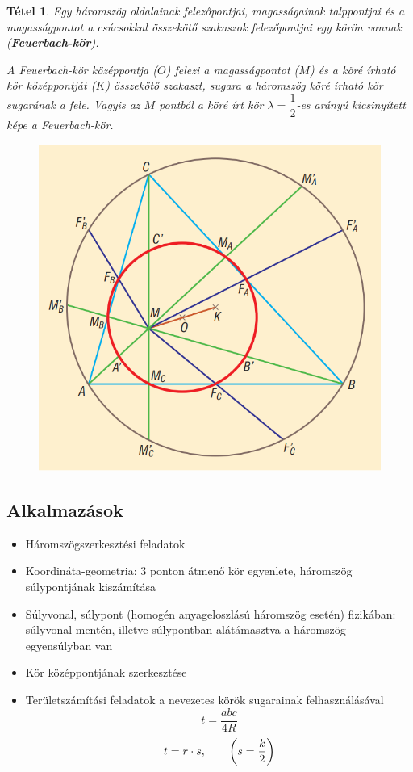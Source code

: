 \documentclass[12pt,a4paper]{article}
\newtheorem{theorem}{Tétel} [section]
\begin{document}
\begin{theorem}
Egy háromszög oldalainak felezőpontjai, magasságainak talppontjai és a magasságpontot a csúcsokkal összekötő szakaszok felezőpontjai egy körön vannak (\textbf{Feuerbach-kör}).

A Feuerbach-kör középpontja ($O$) felezi a magasságpontot ($M$) és a köré írható kör középpontját ($K$) összekötő szakaszt, sugara a háromszög köré írható kör sugarának a fele. Vagyis az $M$ pontból a köré írt kör $\lambda = \dfrac{1}{2}$-es arányú kicsinyített képe a Feuerbach-kör.

\begin{figure}[h]
\centering
\includegraphics[scale=0.4]{geometry/feuerbach}
\end{figure}

\end{theorem}
\subsection{Alkalmazások}
\begin{itemize}
\item Háromszögszerkesztési feladatok
\item Koordináta-geometria: 3 ponton átmenő kör egyenlete, háromszög súlypontjának kiszámítása
\item Súlyvonal, súlypont (homogén anyageloszlású háromszög esetén) fizikában: súlyvonal mentén, illetve súlypontban alátámasztva a háromszög egyensúlyban van
\item Kör középpontjának szerkesztése
\item Területszámítási feladatok a nevezetes körök sugarainak felhasználásával
$$t=\dfrac{abc}{4R}$$
$$t=r\cdot s, \hspace{20px} \left(s=\dfrac{k}{2}\right)$$
\end{itemize}
\newpage
\end{document}
